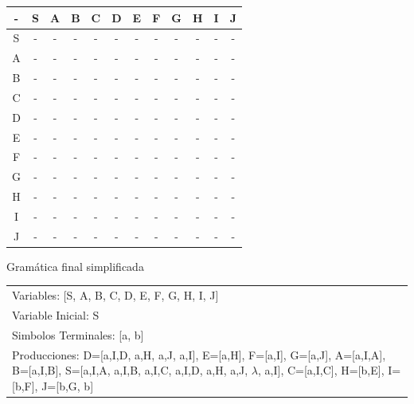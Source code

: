 \documentclass[a4paper,11pt]{article}
\newcommand{\MYp}[1]{ {\color[rgb]{0.392,0.392,0.392}#1} }
\begin{document}
\begin{center}
\begin{tabular}{||c||c||c||c||c||c||c||c||c||c||c||c||}
\hline
\hline
  -  & S & A & B & C & D & E & F & G & H & I & J \\ 
\hline
\hline
 S  &  -  &  -  &  -  &  -  &  -  &  -  &  -  &  -  &  -  &  -  &  -  \\ 
\hline
\hline
 A  &  -  &  -  &  -  &  -  &  -  &  -  &  -  &  -  &  -  &  -  &  -  \\ 
\hline
\hline
 B  &  -  &  -  &  -  &  -  &  -  &  -  &  -  &  -  &  -  &  -  &  -  \\ 
\hline
\hline
 C  &  -  &  -  &  -  &  -  &  -  &  -  &  -  &  -  &  -  &  -  &  -  \\ 
\hline
\hline
 D  &  -  &  -  &  -  &  -  &  -  &  -  &  -  &  -  &  -  &  -  &  -  \\ 
\hline
\hline
 E  &  -  &  -  &  -  &  -  &  -  &  -  &  -  &  -  &  -  &  -  &  -  \\ 
\hline
\hline
 F  &  -  &  -  &  -  &  -  &  -  &  -  &  -  &  -  &  -  &  -  &  -  \\ 
\hline
\hline
 G  &  -  &  -  &  -  &  -  &  -  &  -  &  -  &  -  &  -  &  -  &  -  \\ 
\hline
\hline
 H  &  -  &  -  &  -  &  -  &  -  &  -  &  -  &  -  &  -  &  -  &  -  \\ 
\hline
\hline
 I  &  -  &  -  &  -  &  -  &  -  &  -  &  -  &  -  &  -  &  -  &  -  \\ 
\hline
\hline
 J  &  -  &  -  &  -  &  -  &  -  &  -  &  -  &  -  &  -  &  -  &  -  \\ 
\hline
\hline
\end{tabular}
\end{center}
\MYp{\Huge Gram\'{a}tica final simplificada}
\newline
\begin{center}\begin{tabular}{ m{15cm} }


Variables: [S, A, B, C, D, E, F, G, H, I, J] \\
Variable Inicial: S \\
Simbolos Terminales: [a, b] \\
Producciones: {D=[a,I,D, a,H, a,J, a,I], E=[a,H], F=[a,I], G=[a,J], A=[a,I,A], B=[a,I,B], S=[a,I,A, a,I,B, a,I,C, a,I,D, a,H, a,J, $\lambda$, a,I], C=[a,I,C], H=[b,E], I=[b,F], J=[b,G, b]} \\

\end{tabular}
\end{center}
\end{document}
